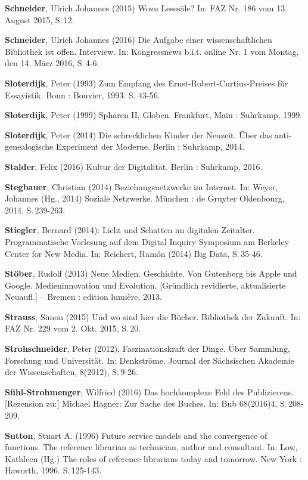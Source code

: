 \documentclass[a4paper,
fontsize=11pt,
oneside,
numbers=noperiodatend,
parskip=half-,
bibliography=totoc,
final
]{scrartcl}
\begin{document}
\textbf{Schneider}, Ulrich Johannes (2015) Wozu Lesesäle? In: FAZ Nr.
186 vom 13. August 2015, S.\,12.

\textbf{Schneider}, Ulrich Johannes (2016) Die Aufgabe einer
wissenschaftlichen Bibliothek ist offen. Interview. In: Kongressnews
b.i.t. online Nr. 1 vom Montag, den 14. März 2016, S.\,4-6.

\textbf{Sloterdijk}, Peter (1993) Zum Empfang des
Ernst-Robert-Curtius-Preises für Essayistik. Bonn : Bouvier, 1993. S.
43-56.

\textbf{Sloterdijk}, Peter (1999) Sphären II, Globen. Frankfurt, Main :
Suhrkamp, 1999.

\textbf{Sloterdijk}, Peter (2014) Die schrecklichen Kinder der Neuzeit.
Über das anti-genealogische Experiment der Moderne. Berlin : Suhrkamp,
2014.

\textbf{Stalder}, Felix (2016) Kultur der Digitalität. Berlin :
Suhrkamp, 2016.

\textbf{Stegbauer}, Christian (2014) Beziehungsnetzwerke im Internet.
In: Weyer, Johannes (Hg., 2014) Soziale Netzwerke. München : de Gruyter
Oldenbourg, 2014. S.\,239-263.

\textbf{Stiegler}, Bernard (2014): Licht und Schatten im digitalen
Zeitalter. Programmatische Vorlesung auf dem Digital Inquiry Symposium
am Berkeley Center for New Media. In: Reichert, Ramón (2014) Big Data,
S.\,35-46.

\textbf{Stöber}, Rudolf (2013) Neue Medien. Geschichte. Von Gutenberg
bis Apple und Google. Medieninnovation und Evolution. {[}Gründlich
revidierte, aktualisierte Neuaufl.{]} -- Bremen : edition lumière, 2013.

\textbf{Strauss}, Simon (2015) Und wo sind hier die Bücher. Bibliothek
der Zukunft. In: FAZ Nr. 229 vom 2. Okt. 2015, S.\,20.

\textbf{Strohschneider}, Peter (2012), Faszinationskraft der Dinge. Über
Sammlung, Forschung und Universität. In: Denkströme. Journal der
Sächsischen Akademie der Wissenschaften, 8(2012), S.\,9-26.

\textbf{Sühl-Strohmenger}; Wilfried (2016) Das hochkomplexe Feld des
Publizierens. {[}Rezension zu:{]} Michael Hagner: Zur Sache des Buches.
In: Bub 68(2016)4, S.\,208-209.

\textbf{Sutton}, Stuart A. (1996) Future service models and the
convergence of functions. The reference librarian as technician, author
and consultant. In: Low, Kathleen (Hg.) The roles of reference
librarians today and tomorrow. New York : Haworth, 1996. S.\,125-143.
\end{document}
